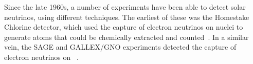 
Since the late 1960s, a number of experiments have been able to detect solar neutrinos, using different techniques. The earliest of these was the Homestake Chlorine detector, which used the capture of electron neutrinos on  nuclei to generate  atoms that could be chemically extracted and counted~\cite{davisSearchNeutrinosSun1968}. In a similar vein, the SAGE and GALLEX/GNO experiments detected the capture of electron neutrinos on ~\cite{abdurashitovMeasurementSolarNeutrino2009,altmannCompleteResultsFive2005}.





